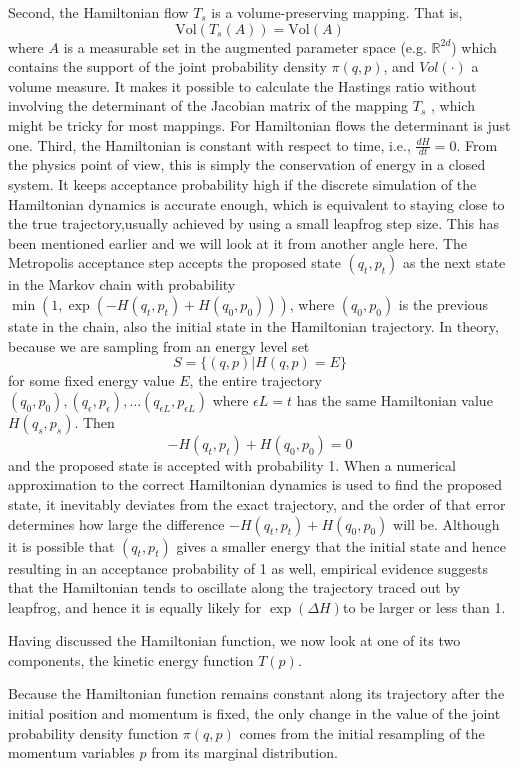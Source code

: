 \documentclass[]{report}
\begin{document}
Second, the Hamiltonian flow $T_s$ is a volume-preserving mapping. That is, 
\[ \text{Vol}(T_s(A)) = \text{Vol}(A) \]
where $A$ is a measurable set in the augmented parameter space (e.g.
$\mathbb{R}^{2d}$) which contains
the support of 
the joint probability density $\pi(q,p)$, and $Vol(\cdot)$ a volume measure. 
It makes it
possible to calculate the Hastings ratio without involving the determinant of
the Jacobian matrix of the mapping $T_s$ , which might be tricky for most
mappings. For Hamiltonian flows the determinant is just one.
Third, the Hamiltonian is constant with respect to time, i.e., $\frac{dH}{dt} =
0$. From the physics point of view, this is simply the conservation of energy in
a closed system. It keeps acceptance probability high if the discrete simulation
of the Hamiltonian dynamics is accurate enough, which is equivalent to staying
close to the true trajectory,usually achieved by using a small leapfrog step size. This has been mentioned earlier
and we will look at it from another angle here. The Metropolis acceptance step
accepts the proposed state $(q_t,p_t)$ as the next state in the Markov chain
with probability $\min(1, \exp(-H(q_t,p_t) + H(q_0,p_0)))$, where $(q_0,p_0)$ is
the previous state in the chain, also the initial state in the Hamiltonian
trajectory. In theory, because we are sampling from an energy level set 
\[ S=\{(q,p)|H(q,p)=E\} \]
for some fixed energy value $E$, the entire trajectory
$(q_0,p_0),(q_\epsilon,p_\epsilon),\dots (q_{\epsilon L},p_{\epsilon L})$ where
$\epsilon L = t $ has the same Hamiltonian value $H(q_s,p_s)$. Then 
\[ -H(q_t,p_t) + H(q_0,p_0) = 0 \]
and the proposed state is accepted with probability 1. When a numerical
approximation to the correct Hamiltonian dynamics is used to find the proposed
state, it inevitably deviates from the exact trajectory, and the order of that
error determines how large the difference $ -H(q_t,p_t) + H(q_0,p_0)$ will be.
Although it is possible that $(q_t,p_t)$ gives a smaller energy that the initial
state and hence resulting in an acceptance probability of 1 as well, empirical
evidence suggests that the Hamiltonian tends to oscillate along the trajectory
traced out by leapfrog, and hence it is equally likely for $\exp(\Delta H)$to be
larger or less than 1. 

Having discussed the Hamiltonian function, we now look at one of its two
components, the kinetic energy function $T(p)$.  

Because the
Hamiltonian function remains constant along its trajectory after the initial
position and momentum is fixed, the only change in the value of the joint probability
density function $\pi(q,p)$ comes from the initial resampling of the momentum variables $p$
from its marginal distribution.
\end{document}
